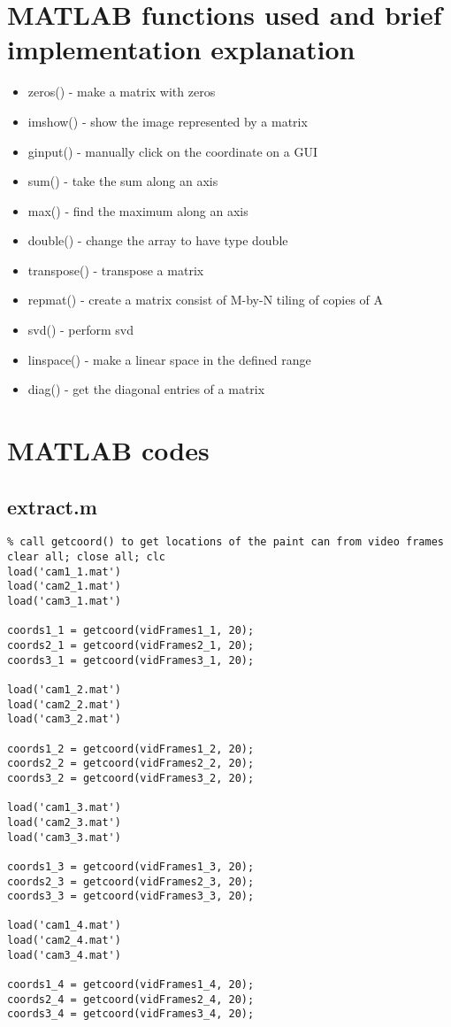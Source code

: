 \documentclass[12pt, a4paper]{article}
\begin{document}
\appendix
\section{MATLAB functions used and brief implementation explanation}
\begin{itemize}
    \item zeros() - make a matrix with zeros
    \item imshow() - show the image represented by a matrix
    \item ginput() - manually click on the coordinate on a GUI
    \item sum() - take the sum along an axis
    \item max() - find the maximum along an axis
    \item double() - change the array to have type double
    \item transpose() - transpose a matrix
    \item repmat() - create a matrix consist of M-by-N tiling of copies of A
    \item svd() - perform svd
    \item linspace() - make a linear space in the defined range
    \item diag() - get the diagonal entries of a matrix
\end{itemize}

\section{MATLAB codes}
\subsection{extract.m}
\begin{verbatim}
% call getcoord() to get locations of the paint can from video frames
clear all; close all; clc
load('cam1_1.mat')
load('cam2_1.mat')
load('cam3_1.mat')

coords1_1 = getcoord(vidFrames1_1, 20);
coords2_1 = getcoord(vidFrames2_1, 20);
coords3_1 = getcoord(vidFrames3_1, 20);

load('cam1_2.mat')
load('cam2_2.mat')
load('cam3_2.mat')

coords1_2 = getcoord(vidFrames1_2, 20);
coords2_2 = getcoord(vidFrames2_2, 20);
coords3_2 = getcoord(vidFrames3_2, 20);

load('cam1_3.mat')
load('cam2_3.mat')
load('cam3_3.mat')

coords1_3 = getcoord(vidFrames1_3, 20);
coords2_3 = getcoord(vidFrames2_3, 20);
coords3_3 = getcoord(vidFrames3_3, 20);

load('cam1_4.mat')
load('cam2_4.mat')
load('cam3_4.mat')

coords1_4 = getcoord(vidFrames1_4, 20);
coords2_4 = getcoord(vidFrames2_4, 20);
coords3_4 = getcoord(vidFrames3_4, 20);   
\end{verbatim}
\end{document}
